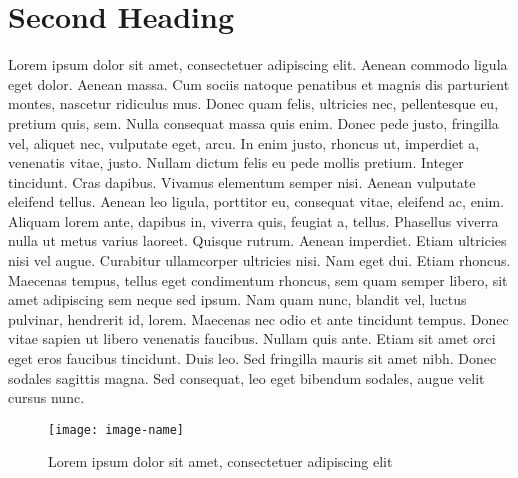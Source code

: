 \documentclass[11pt,a4paper]{scrreprt}
\begin{document}
\section{Second Heading} \label{sec:second-heading}

Lorem ipsum dolor sit amet, consectetuer adipiscing elit. Aenean commodo ligula eget dolor. Aenean massa. Cum sociis natoque penatibus et magnis dis parturient montes, nascetur ridiculus mus. Donec quam felis, ultricies nec, pellentesque eu, pretium quis, sem. Nulla consequat massa quis enim. Donec pede justo, fringilla vel, aliquet nec, vulputate eget, arcu. In enim justo, rhoncus ut, imperdiet a, venenatis vitae, justo. Nullam dictum felis eu pede mollis pretium. Integer tincidunt. Cras dapibus. Vivamus elementum semper nisi. Aenean vulputate eleifend tellus. Aenean leo ligula, porttitor eu, consequat vitae, eleifend ac, enim. Aliquam lorem ante, dapibus in, viverra quis, feugiat a, tellus. Phasellus viverra nulla ut metus varius laoreet. Quisque rutrum. Aenean imperdiet. Etiam ultricies nisi vel augue. Curabitur ullamcorper ultricies nisi. Nam eget dui. Etiam rhoncus. Maecenas tempus, tellus eget condimentum rhoncus, sem quam semper libero, sit amet adipiscing sem neque sed ipsum. Nam quam nunc, blandit vel, luctus pulvinar, hendrerit id, lorem. Maecenas nec odio et ante tincidunt tempus. Donec vitae sapien ut libero venenatis faucibus. Nullam quis ante. Etiam sit amet orci eget eros faucibus tincidunt. Duis leo. Sed fringilla mauris sit amet nibh. Donec sodales sagittis magna. Sed consequat, leo eget bibendum sodales, augue velit cursus nunc.

\begin{figure}[!ht]
    \centering
    \texttt{[image: image-name]}
    \caption[Lorem ipsum dolor sit amet, consectetuer adipiscing elit]{Lorem ipsum dolor sit amet, consectetuer adipiscing elit} %
    \label{fig:image-label}
\end{figure}
\noindent


\printbibliography[heading=bibintoc,title={Bibliography}]
\newpage

\end{document}
